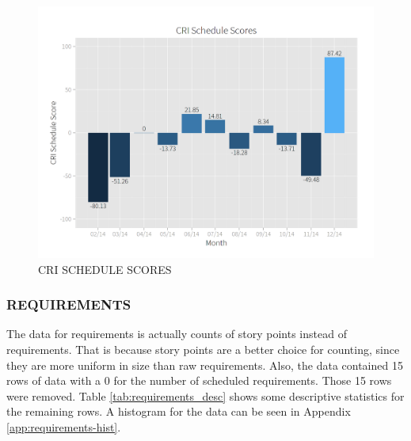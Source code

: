 \documentclass[SDSUThesis.tex]{subfiles}
\begin{document}
            \begin{figure}[ht]
                \centering
                \includegraphics[scale=.3]{images/schedule_scores.png}
                \caption{CRI SCHEDULE SCORES}
                \label{fig:schedule-scores}
            \end{figure}
            
            
        \subsubsection{REQUIREMENTS}
        \label{sec:case-req}
            The data for requirements is actually counts of story points
            instead of requirements.  That is because story points
            are a better choice for counting, since they are more
            uniform in size than raw requirements.  Also, the data
            contained 15 rows of data with a 0 for the number of
            scheduled requirements.  Those 15 rows were removed.
            Table \ref{tab:requirements_desc} shows some descriptive
            statistics for the remaining rows. A histogram for the
            data can be seen in Appendix \ref{app:requirements-hist}.
            
\end{document}
